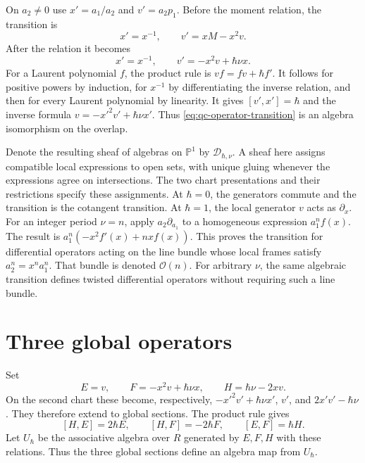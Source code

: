 On $a_2\ne0$ use $x'=a_1/a_2$ and $v'=a_2p_1$.
Before the moment relation, the transition is
\[
 x'=x^{-1},\qquad v'=xM-x^2v.
\]
After the relation it becomes
\begin{equation}\label{eq:qc-operator-transition}
 x'=x^{-1},\qquad v'=-x^2v+\hbar\nu x.
\end{equation}
For a Laurent polynomial $f$, the product rule is
$vf=fv+\hbar f'$.
It follows for positive powers by induction, for $x^{-1}$ by differentiating the inverse relation, and then for every Laurent polynomial by linearity.
It gives $[v',x']=\hbar$ and the inverse formula
$v=-x'^2v'+\hbar\nu x'$.
Thus \eqref{eq:qc-operator-transition} is an algebra isomorphism on the overlap.

Denote the resulting sheaf of algebras on $\mathbb P^1$ by $\mathcal D_{\hbar,\nu}$.
A sheaf here assigns compatible local expressions to open sets, with unique gluing whenever the expressions agree on intersections.
The two chart presentations and their restrictions specify these assignments.
At $\hbar=0$, the generators commute and the transition is the cotangent transition.
At $\hbar=1$, the local generator $v$ acts as $\partial_x$.
For an integer period $\nu=n$, apply $a_2\partial_{a_1}$ to a homogeneous expression $a_1^n f(x)$.
The result is $a_1^n(-x^2 f'(x)+nx f(x))$.
This proves the transition for differential operators acting on the line bundle whose local frames satisfy $a_2^n=x^n a_1^n$.
That bundle is denoted $\mathcal O(n)$.
For arbitrary $\nu$, the same algebraic transition defines twisted differential operators without requiring such a line bundle.

\section{Three global operators}

Set
\begin{equation}\label{eq:qc-three-operators}
 E=v,\qquad F=-x^2v+\hbar\nu x,\qquad H=\hbar\nu-2xv.
\end{equation}
On the second chart these become, respectively,
$-x'^2v'+\hbar\nu x'$, $v'$, and $2x'v'-\hbar\nu$.
They therefore extend to global sections.
The product rule gives
\[
 [H,E]=2\hbar E,\qquad [H,F]=-2\hbar F,
 \qquad [E,F]=\hbar H.
\]
Let $U_\hbar$ be the associative algebra over $R$ generated by $E,F,H$ with these relations.
Thus the three global sections define an algebra map from $U_\hbar$.

